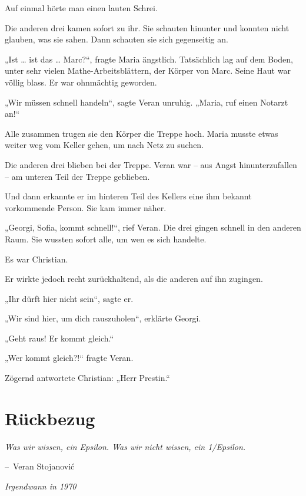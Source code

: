 \documentclass[oneside]{memoir}
\makeatletter
\newenvironment{chapquote}[2][2em]
  {\setlength{\@tempdima}{#1}%
   \def\chapquote@author{#2}%
   \parshape 1 \@tempdima \dimexpr\textwidth-2\@tempdima\relax%
   \itshape}
  {\par\normalfont\hfill--\ \chapquote@author\hspace*{\@tempdima}\par\bigskip}
\makeatother
\begin{document}
Auf einmal hörte man einen lauten Schrei.

Die anderen drei kamen sofort zu ihr. Sie schauten hinunter und konnten nicht glauben, was sie sahen. Dann schauten sie sich gegenseitig an.

„Ist \ldots{} ist das \ldots{} Marc?“, fragte Maria ängstlich.
Tatsächlich lag auf dem Boden, unter sehr vielen Mathe-Arbeitsblättern, der Körper von Marc. Seine Haut war völlig blass. Er war ohnmächtig geworden.

„Wir müssen schnell handeln“, sagte Veran unruhig. „Maria, ruf einen Notarzt an!“

Alle zusammen trugen sie den Körper die Treppe hoch. Maria musste etwas weiter weg vom Keller gehen, um nach Netz zu suchen.

Die anderen drei blieben bei der Treppe. Veran war -- aus Angst hinunterzufallen -- am unteren Teil der Treppe geblieben.

Und dann erkannte er im hinteren Teil des Kellers eine ihm bekannt vorkommende Person. Sie kam immer näher.

„Georgi, Sofia, kommt schnell!“, rief Veran. Die drei gingen schnell in den anderen Raum. Sie wussten sofort alle, um wen es sich handelte.

Es war Christian.

Er wirkte jedoch recht zurückhaltend, als die anderen auf ihn zugingen.

„Ihr dürft hier nicht sein“, sagte er.

„Wir sind hier, um dich rauszuholen“, erklärte Georgi.

„Geht raus! Er kommt gleich.“

„Wer kommt gleich?!“ fragte Veran.

Zögernd antwortete Christian: „Herr Prestin.“

\chapter{Rückbezug} %
\begin{chapquote}{Veran Stojanović}
\glqq Was wir wissen, ein Epsilon. Was wir nicht wissen, ein 1/Epsilon.\grqq
\end{chapquote}

\textit{Irgendwann in 1970}
\end{document}
